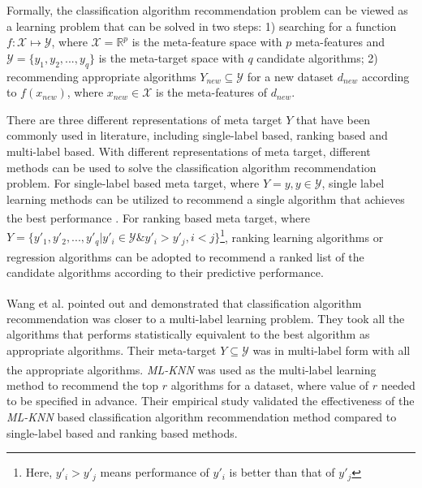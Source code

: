 \documentclass[review,3p,twocolumn,times]{elsarticle}
\newcommand{\upcite}[1]{\textsuperscript{\cite{#1}}}
\begin{document}
Formally, the classification algorithm recommendation problem can be viewed as a learning problem that can be solved in two steps: 1) searching for a function $f: \mathcal{X} \mapsto \mathcal{Y}$, where $ \mathcal{X}=\mathbb{R}^p$ is the meta-feature space with $p$ meta-features and $\mathcal{Y}=\{y_1,y_2,...,y_q\}$ is the meta-target space with $q$ candidate algorithms; 2) recommending appropriate algorithms $Y_{new} \subseteq \mathcal{Y}$ for a new dataset $d_{new}$ according to $f(x_{new})$, where $x_{new} \in \mathcal{X}$ is the meta-features of $d_{new}$.

There are three different representations of meta target $Y$ that have been commonly used in literature, including single-label based, ranking based and multi-label based. With different representations of meta target, different methods can be used to solve the classification algorithm recommendation problem. For single-label based meta target, where $Y=y, y\in\mathcal{Y}$, single label learning methods can be utilized to recommend a single algorithm that achieves the best performance \upcite{Ali2006On,Brazdil1994Characterizing,Lee2013Automatic,Gore2013Dynamic}. For ranking based meta target, where $Y=\{y'_1,y'_2, ..., y'_q|y'_i\in\mathcal{Y} \& y'_i>y'_j, i<j\}$\footnote{Here, $y'_i>y'_j$ means performance of $y'_i$ is better than that of $y'_j$}, ranking learning algorithms \upcite{Brazdil2000A,Brazdil2003Ranking} or regression algorithms \upcite{Bensusan2001Estimating,Reif2014Automatic,Balte2015Algorithm} can be adopted to recommend a ranked list of the candidate algorithms according to their predictive performance.

Wang et al.\upcite{Wang2014A} pointed out and demonstrated that classification algorithm recommendation was closer to a multi-label learning problem. They took all the algorithms that performs statistically equivalent to the best algorithm as appropriate algorithms. Their meta-target $Y\subseteq\mathcal{Y}$ was in multi-label form with all the appropriate algorithms. \emph{ML-KNN}\upcite{Zhang2007A} was used as the multi-label learning method to recommend the top $r$ algorithms for a dataset, where value of $r$ needed to be specified in advance. Their empirical study validated the effectiveness of the \emph{ML-KNN} based classification algorithm recommendation method compared to single-label based and ranking based methods. %
\end{document}
